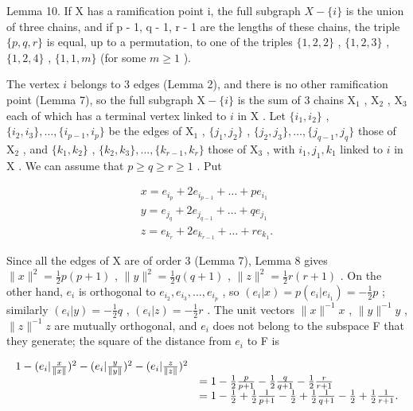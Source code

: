 Lemma 10. If X has a ramification point i, the full subgraph \(X - \{i\}\) is the union of three chains, and if p - 1, q - 1, r - 1 are the lengths of these chains, the triple \(\{p, q, r\}\) is equal, up to a permutation, to one of the triples \(\{1, 2, 2\}\) , \(\{1, 2, 3\}\) , \(\{1, 2, 4\}\) , \(\{1, 1, m\}\) (for some \(m \geqslant 1\) ).

The vertex \(i\) belongs to 3 edges (Lemma 2), and there is no other ramification point (Lemma 7), so the full subgraph \(\mathrm{X} - \{i\}\) is the sum of 3 chains \(\mathrm{X}_1\) , \(\mathrm{X}_2\) , \(\mathrm{X}_3\) each of which has a terminal vertex linked to \(i\) in \(\mathrm{X}\) . Let \(\{i_1, i_2\}\) , \(\{i_2, i_3\}, \ldots, \{i_{p-1}, i_p\}\) be the edges of \(\mathrm{X}_1\) , \(\{j_1, j_2\}\) , \(\{j_2, j_3\}, \ldots, \{j_{q-1}, j_q\}\) those of \(\mathrm{X}_2\) , and \(\{k_1, k_2\}\) , \(\{k_2, k_3\}, \ldots, \{k_{r-1}, k_r\}\) those of \(\mathrm{X}_3\) , with \(i_1, j_1, k_1\) linked to \(i\) in \(\mathrm{X}\) . We can assume that \(p \geqslant q \geqslant r \geqslant 1\) . Put

\[
\begin{array}{l} x = e _ {i _ {p}} + 2 e _ {i _ {p - 1}} + \dots + p e _ {i _ {1}} \\ y = e _ {j _ {q}} + 2 e _ {j _ {q - 1}} + \dots + q e _ {j _ {1}} \\ z = e _ {k _ {r}} + 2 e _ {k _ {r - 1}} + \dots + r e _ {k _ {1}}. \end{array}
\]

Since all the edges of X are of order 3 (Lemma 7), Lemma 8 gives \(\| x\|^2 = \frac{1}{2} p(p + 1)\) , \(\| y\|^2 = \frac{1}{2} q(q + 1)\) , \(\| z\|^2 = \frac{1}{2} r(r + 1)\) . On the other hand, \(e_i\) is orthogonal to \(e_{i_2}, e_{i_3}, \ldots, e_{i_p}\) , so \((e_i|x) = p(e_i|e_{i_1}) = -\frac{1}{2} p\) ; similarly \((e_i|y) = -\frac{1}{2} q\) , \((e_i|z) = -\frac{1}{2} r\) . The unit vectors \(\| x\|^ {-1}x\) , \(\| y\|^ {-1}y\) , \(\| z\|^ {-1}z\) are mutually orthogonal, and \(e_i\) does not belong to the subspace F that they generate; the square of the distance from \(e_i\) to F is

\[
\begin{array}{r l} 1 - (e _ {i} | \frac {x}{\| x \|}) ^ {2} - (e _ {i} | \frac {y}{\| y \|}) ^ {2} - (e _ {i} | \frac {z}{\| z \|}) ^ {2} \\ & = 1 - \frac {1}{2} \frac {p}{p + 1} - \frac {1}{2} \frac {q}{q + 1} - \frac {1}{2} \frac {r}{r + 1} \\ & = 1 - \frac {1}{2} + \frac {1}{2} \frac {1}{p + 1} - \frac {1}{2} + \frac {1}{2} \frac {1}{q + 1} - \frac {1}{2} + \frac {1}{2} \frac {1}{r + 1}. \end{array}
\]


